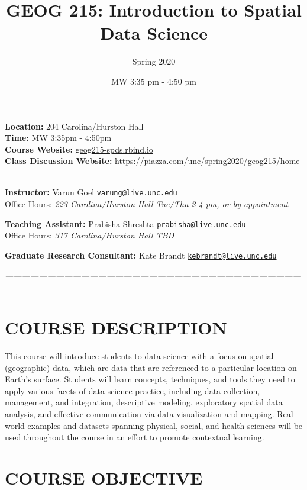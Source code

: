 \documentclass[11pt,]{article}
\title{GEOG 215: Introduction to Spatial Data Science}
\author{Spring 2020}
\date{MW 3:35 pm - 4:50 pm}
\begin{document}
\maketitle

\textbf{Location:} 204 Carolina/Hurston Hall\\
\textbf{Time:} MW 3:35pm - 4:50pm\\
\textbf{Course Website:} \url{geog215-spds.rbind.io}\\
\textbf{Class Discussion Website:}
\url{https://piazza.com/unc/spring2020/geog215/home} ~ ~

\textbf{Instructor:} Varun Goel \textbar{}
\href{mailto:varung@live.unc.edu}{\nolinkurl{varung@live.unc.edu}}\\
Office Hours: \emph{223 Carolina/Hurston Hall \textbar{} Tue/Thu 2-4 pm,
or by appointment}

\textbf{Teaching Assistant:} Prabisha Shreshta \textbar{}
\href{mailto:prabisha@live.unc.edu}{\nolinkurl{prabisha@live.unc.edu}}\\
Office Hours: \emph{317 Carolina/Hurston Hall \textbar{} TBD}

\textbf{Graduate Research Consultant:} Kate Brandt \textbar{}
\href{mailto:kebrandt@live.unc.edu}{\nolinkurl{kebrandt@live.unc.edu}}

\emph{---------------------------------------------------------------------------------------------------------------------------------}

\hypertarget{course-description}{%
\section{COURSE DESCRIPTION}\label{course-description}}

This course will introduce students to data science with a focus on
spatial (geographic) data, which are data that are referenced to a
particular location on Earth's surface. Students will learn concepts,
techniques, and tools they need to apply various facets of data science
practice, including data collection, management, and integration,
descriptive modeling, exploratory spatial data analysis, and effective
communication via data visualization and mapping. Real world examples
and datasets spanning physical, social, and health sciences will be used
throughout the course in an effort to promote contextual learning.

\hypertarget{course-objective}{%
\section{COURSE OBJECTIVE}\label{course-objective}}
\end{document}
